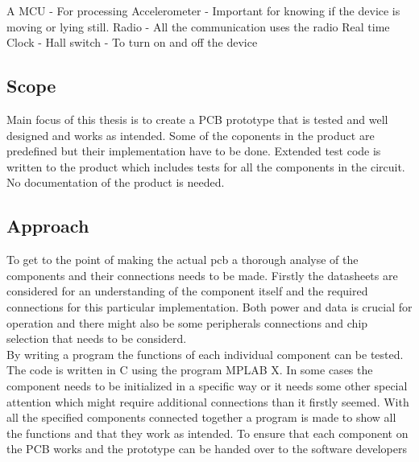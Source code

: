 A MCU - For processing
Accelerometer - Important for knowing if the device is moving or lying still.
Radio - All the communication uses the radio 
Real time Clock - 
Hall switch - To turn on and off the device

\subsection{Scope}
Main focus of this thesis is to create a PCB prototype that is tested and well designed and works as intended. Some of the coponents in the product are predefined but their implementation have to be done.
Extended test code is written to the product which includes tests for all the components in the circuit.  
No documentation of the product is needed.

\subsection{Approach}
To get to the point of making the actual \gls{pcb} a thorough analyse of the components and their connections needs to be made. Firstly the datasheets are considered for an understanding of the component itself and the required connections for this particular implementation. Both power and data is crucial for operation and there might also be some peripherals connections and chip selection that needs to be considerd. \\
By writing a program the functions of each individual component can be tested. The code is written in C using the program MPLAB X\cite{MPLAB}.  In some cases the component needs to be initialized in a specific way or it needs some other special attention which might require additional connections than it firstly seemed.
With all the specified components connected together a program is made to show all the functions and that they work as intended. 
To ensure that each component on the PCB works and the prototype can be handed over to the software developers  

\thispagestyle{empty}